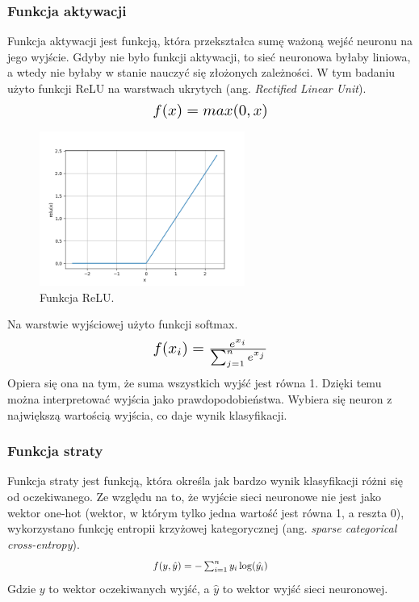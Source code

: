 \subsubsection{Funkcja aktywacji}\label{subsubsec:funkcja_aktywacji}
Funkcja aktywacji jest funkcją, która przekształca sumę ważoną wejść neuronu na jego wyjście.
Gdyby nie było funkcji aktywacji, to sieć neuronowa byłaby liniowa, a wtedy nie byłaby w stanie nauczyć się złożonych zależności.
W tym badaniu użyto funkcji ReLU na warstwach ukrytych (ang. \textit{Rectified Linear Unit}).
\begin{equation}
    \resizebox{0.3\textwidth}{!}{$f(x) = max(0, x)$}
\end{equation}
\begin{figure}[H]
    \centering
    \includegraphics[width=0.6\textwidth]{img/relu.png}
    \caption{Funkcja ReLU.}
    \label{fig:relu}
\end{figure}
Na warstwie wyjściowej użyto funkcji softmax.
\begin{equation}
    \resizebox{0.3\textwidth}{!}{$f(x_i) = \frac{e^{x_i}}{\sum_{j=1}^{n} e^{x_j}}$}
\end{equation}
Opiera się ona na tym, że suma wszystkich wyjść jest równa 1. Dzięki temu można interpretować wyjścia jako prawdopodobieństwa.
Wybiera się neuron z największą wartością wyjścia, co daje wynik klasyfikacji.
\subsubsection{Funkcja straty}\label{subsubsec:funkcja_straty}
Funkcja straty jest funkcją, która określa jak bardzo wynik klasyfikacji różni się od oczekiwanego.
Ze względu na to, że wyjście sieci neuronowe nie jest jako wektor one-hot
(wektor, w którym tylko jedna wartość jest równa 1, a reszta 0),
wykorzystano funkcję entropii krzyżowej kategorycznej (ang. \textit{sparse categorical cross-entropy}).
\begin{equation}
    \resizebox{0.3\textwidth}{!}{$f(y, \hat{y}) = -\sum_{i=1}^{n} y_i \log(\hat{y_i})$}
\end{equation}
Gdzie $y$ to wektor oczekiwanych wyjść, a $\hat{y}$ to wektor wyjść sieci neuronowej.
